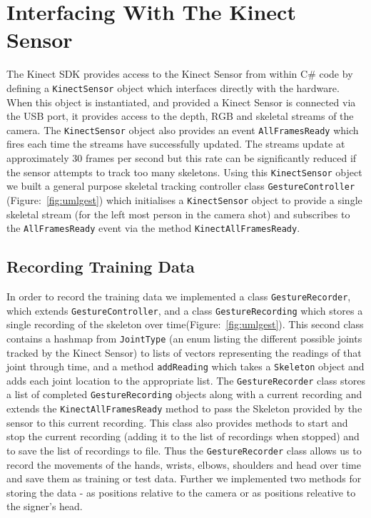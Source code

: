 \chapter{Interfacing With The Kinect Sensor}
\ifpdf
    \graphicspath{{Chapter3/Chapter3Figs/PNG/}{Chapter3/Chapter3Figs/PDF/}{Chapter3/Chapter3Figs/}}
\else
    \graphicspath{{Chapter3/Chapter3Figs/EPS/}{Chapter3/Chapter3Figs/}}
\fi


The Kinect SDK provides access to the Kinect Sensor from within C\# code by defining a \verb|KinectSensor| object which interfaces directly with the hardware. When this object is instantiated, and provided a Kinect Sensor is connected via the USB port, it provides access to the depth, RGB and skeletal streams of the camera. The \verb|KinectSensor| object also provides an event  \verb|AllFramesReady| which fires each time the streams have successfully updated. The streams update at approximately 30 frames per second but this rate can be significantly reduced if the sensor attempts to track too many skeletons. Using this \verb|KinectSensor| object we built a general purpose skeletal tracking controller class \verb|GestureController| (Figure:~\ref{fig:umlgest}) which initialises a \verb|KinectSensor| object to provide a single skeletal stream (for the left most person in the camera shot) and subscribes to the \verb|AllFramesReady| event via the method \verb|KinectAllFramesReady|.

\section{Recording Training Data}
In order to record the training data we implemented a class \verb|GestureRecorder|, which extends \verb|GestureController|, and a class \verb|GestureRecording| which stores a single recording of the skeleton over time(Figure:~\ref{fig:umlgest}). This second class contains a hashmap from \verb|JointType| (an enum listing the different possible joints tracked by the Kinect Sensor) to lists of vectors representing the readings of that joint through time, and a method \verb|addReading| which takes a \verb|Skeleton| object and adds each joint location to the appropriate list. The \verb|GestureRecorder| class stores a list of completed \verb|GestureRecording| objects along with a current recording and extends the \verb|KinectAllFramesReady| method to pass the Skeleton provided by the sensor to this current recording. This class also provides methods to start and stop the current recording (adding it to the list of recordings when stopped) and to save the list of recordings to file. Thus the \verb|GestureRecorder| class allows us to record the movements of the hands, wrists, elbows, shoulders and head over time and save them as training or test data. Further we implemented two methods for storing the data - as positions relative to the camera or as positions releative to the signer's head.

